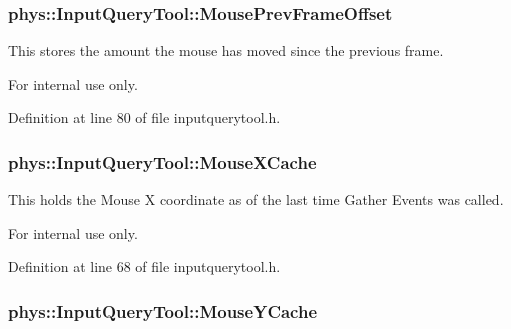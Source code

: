 \hypertarget{classphys_1_1InputQueryTool_af0e34b7565836f2ebbb15b0d37d10718}{
\subsubsection[{MousePrevFrameOffset}]{ {\bf phys::InputQueryTool::MousePrevFrameOffset}}}
\label{da/d96/classphys_1_1InputQueryTool_af0e34b7565836f2ebbb15b0d37d10718}


This stores the amount the mouse has moved since the previous frame. 

\begin{DoxyInternal}{For internal use only.}
\end{DoxyInternal}


Definition at line 80 of file inputquerytool.h.

\hypertarget{classphys_1_1InputQueryTool_a857f0b9ad8bb720f1daf57c9eda6e0fb}{
\subsubsection[{MouseXCache}]{ {\bf phys::InputQueryTool::MouseXCache}}}
\label{da/d96/classphys_1_1InputQueryTool_a857f0b9ad8bb720f1daf57c9eda6e0fb}


This holds the Mouse X coordinate as of the last time Gather Events was called. 

\begin{DoxyInternal}{For internal use only.}
\end{DoxyInternal}


Definition at line 68 of file inputquerytool.h.

\hypertarget{classphys_1_1InputQueryTool_a9378af076545f92b70d853776cc6065c}{
\subsubsection[{MouseYCache}]{ {\bf phys::InputQueryTool::MouseYCache}}}
\label{da/d96/classphys_1_1InputQueryTool_a9378af076545f92b70d853776cc6065c}



